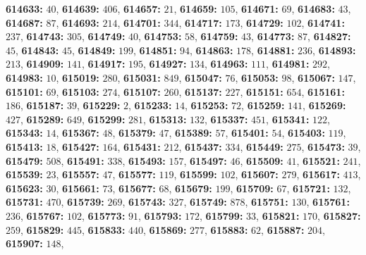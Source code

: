 \textsf{\bfseries 614633:} $40$, \textsf{\bfseries 614639:} $406$, \textsf{\bfseries 614657:} $21$, \textsf{\bfseries 614659:} $105$, \textsf{\bfseries 614671:} $69$, \textsf{\bfseries 614683:} $43$, \textsf{\bfseries 614687:} $87$, \textsf{\bfseries 614693:} $214$, \textsf{\bfseries 614701:} $344$, \textsf{\bfseries 614717:} $173$, \textsf{\bfseries 614729:} $102$, \textsf{\bfseries 614741:} $237$, \textsf{\bfseries 614743:} $305$, \textsf{\bfseries 614749:} $40$, \textsf{\bfseries 614753:} $58$, \textsf{\bfseries 614759:} $43$, \textsf{\bfseries 614773:} $87$, \textsf{\bfseries 614827:} $45$, \textsf{\bfseries 614843:} $45$, \textsf{\bfseries 614849:} $199$, \textsf{\bfseries 614851:} $94$, \textsf{\bfseries 614863:} $178$, \textsf{\bfseries 614881:} $236$, \textsf{\bfseries 614893:} $213$, \textsf{\bfseries 614909:} $141$, \textsf{\bfseries 614917:} $195$, \textsf{\bfseries 614927:} $134$, \textsf{\bfseries 614963:} $111$, \textsf{\bfseries 614981:} $292$, \textsf{\bfseries 614983:} $10$, \textsf{\bfseries 615019:} $280$, \textsf{\bfseries 615031:} $849$, \textsf{\bfseries 615047:} $76$, \textsf{\bfseries 615053:} $98$, \textsf{\bfseries 615067:} $147$, \textsf{\bfseries 615101:} $69$, \textsf{\bfseries 615103:} $274$, \textsf{\bfseries 615107:} $260$, \textsf{\bfseries 615137:} $227$, \textsf{\bfseries 615151:} $654$, \textsf{\bfseries 615161:} $186$, \textsf{\bfseries 615187:} $39$, \textsf{\bfseries 615229:} $2$, \textsf{\bfseries 615233:} $14$, \textsf{\bfseries 615253:} $72$, \textsf{\bfseries 615259:} $141$, \textsf{\bfseries 615269:} $427$, \textsf{\bfseries 615289:} $649$, \textsf{\bfseries 615299:} $281$, \textsf{\bfseries 615313:} $132$, \textsf{\bfseries 615337:} $451$, \textsf{\bfseries 615341:} $122$, \textsf{\bfseries 615343:} $14$, \textsf{\bfseries 615367:} $48$, \textsf{\bfseries 615379:} $47$, \textsf{\bfseries 615389:} $57$, \textsf{\bfseries 615401:} $54$, \textsf{\bfseries 615403:} $119$, \textsf{\bfseries 615413:} $18$, \textsf{\bfseries 615427:} $164$, \textsf{\bfseries 615431:} $212$, \textsf{\bfseries 615437:} $334$, \textsf{\bfseries 615449:} $275$, \textsf{\bfseries 615473:} $39$, \textsf{\bfseries 615479:} $508$, \textsf{\bfseries 615491:} $338$, \textsf{\bfseries 615493:} $157$, \textsf{\bfseries 615497:} $46$, \textsf{\bfseries 615509:} $41$, \textsf{\bfseries 615521:} $241$, \textsf{\bfseries 615539:} $23$, \textsf{\bfseries 615557:} $47$, \textsf{\bfseries 615577:} $119$, \textsf{\bfseries 615599:} $102$, \textsf{\bfseries 615607:} $279$, \textsf{\bfseries 615617:} $413$, \textsf{\bfseries 615623:} $30$, \textsf{\bfseries 615661:} $73$, \textsf{\bfseries 615677:} $68$, \textsf{\bfseries 615679:} $199$, \textsf{\bfseries 615709:} $67$, \textsf{\bfseries 615721:} $132$, \textsf{\bfseries 615731:} $470$, \textsf{\bfseries 615739:} $269$, \textsf{\bfseries 615743:} $327$, \textsf{\bfseries 615749:} $878$, \textsf{\bfseries 615751:} $130$, \textsf{\bfseries 615761:} $236$, \textsf{\bfseries 615767:} $102$, \textsf{\bfseries 615773:} $91$, \textsf{\bfseries 615793:} $172$, \textsf{\bfseries 615799:} $33$, \textsf{\bfseries 615821:} $170$, \textsf{\bfseries 615827:} $259$, \textsf{\bfseries 615829:} $445$, \textsf{\bfseries 615833:} $440$, \textsf{\bfseries 615869:} $277$, \textsf{\bfseries 615883:} $62$, \textsf{\bfseries 615887:} $204$, \textsf{\bfseries 615907:} $148$, 
